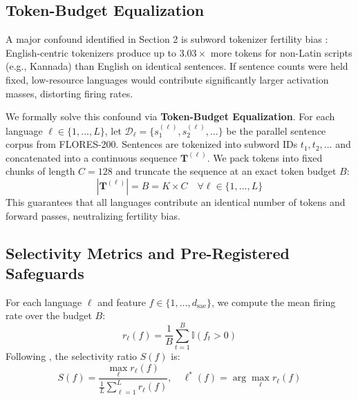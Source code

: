 \documentclass[11pt]{article}
\begin{document}
\subsection{Token-Budget Equalization}
A major confound identified in Section 2 is subword tokenizer fertility bias \citep{srivastava2026tokenizer, lundin2026token}: English-centric tokenizers produce up to $3.03\times$ more tokens for non-Latin scripts (e.g., Kannada) than English on identical sentences. If sentence counts were held fixed, low-resource languages would contribute significantly larger activation masses, distorting firing rates.

We formally solve this confound via \textbf{Token-Budget Equalization}. For each language $\ell \in \{1, \dots, L\}$, let $\mathcal{D}_\ell = \{s_1^{(\ell)}, s_2^{(\ell)}, \dots\}$ be the parallel sentence corpus from FLORES-200. Sentences are tokenized into subword IDs $t_1, t_2, \dots$ and concatenated into a continuous sequence $\mathbf{T}^{(\ell)}$. We pack tokens into fixed chunks of length $C = 128$ and truncate the sequence at an exact token budget $B$:
\begin{equation}
|\mathbf{T}^{(\ell)}| = B = K \times C \quad \forall \ell \in \{1, \dots, L\}
\end{equation}
This guarantees that all languages contribute an identical number of tokens and forward passes, neutralizing fertility bias.

\subsection{Selectivity Metrics and Pre-Registered Safeguards}
For each language $\ell$ and feature $f \in \{1, \dots, d_{\text{sae}}\}$, we compute the mean firing rate over the budget $B$:
\begin{equation}
r_\ell(f) = \frac{1}{B} \sum_{t=1}^{B} \mathbb{I}(f_t > 0)
\end{equation}
Following \citet{deng2025unveiling}, the selectivity ratio $S(f)$ is:
\begin{equation}
S(f) = \frac{\max_\ell r_\ell(f)}{\frac{1}{L} \sum_{\ell=1}^L r_\ell(f)}, \quad \ell^*(f) = \arg\max_\ell r_\ell(f)
\end{equation}
\end{document}

